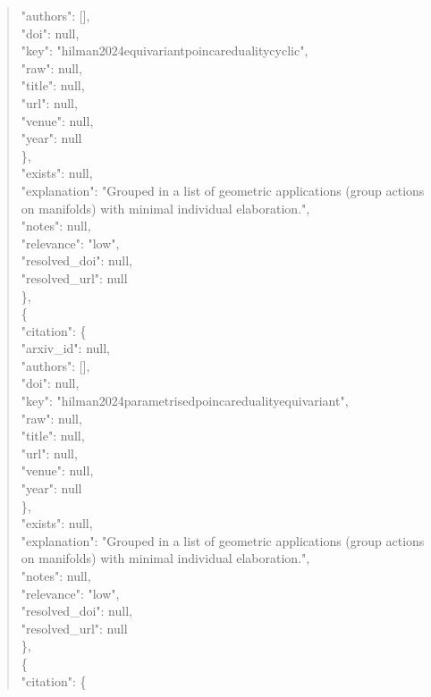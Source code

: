 \documentclass[11pt]{article}
\begin{document}
\begin{quote}
        "authors": [],\\
        "doi": null,\\
        "key": "hilman2024equivariantpoincaredualitycyclic",\\
        "raw": null,\\
        "title": null,\\
        "url": null,\\
        "venue": null,\\
        "year": null\\
      \},\\
      "exists": null,\\
      "explanation": "Grouped in a list of geometric applications (group actions on manifolds) with minimal individual elaboration.",\\
      "notes": null,\\
      "relevance": "low",\\
      "resolved\_doi": null,\\
      "resolved\_url": null\\
    \},\\
    \{\\
      "citation": \{\\
        "arxiv\_id": null,\\
        "authors": [],\\
        "doi": null,\\
        "key": "hilman2024parametrisedpoincaredualityequivariant",\\
        "raw": null,\\
        "title": null,\\
        "url": null,\\
        "venue": null,\\
        "year": null\\
      \},\\
      "exists": null,\\
      "explanation": "Grouped in a list of geometric applications (group actions on manifolds) with minimal individual elaboration.",\\
      "notes": null,\\
      "relevance": "low",\\
      "resolved\_doi": null,\\
      "resolved\_url": null\\
    \},\\
    \{\\
      "citation": \{\\

\end{quote}
\end{document}
